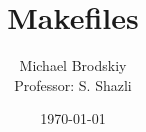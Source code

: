 


\def\code#1{\texttt{#1}}

\pagestyle{fancy}

\title{Makefiles}
\date{\today}
\author{Michael Brodskiy\\ \small Professor: S. Shazli}



\maketitle

\thispagestyle{fancy}

\newpage

